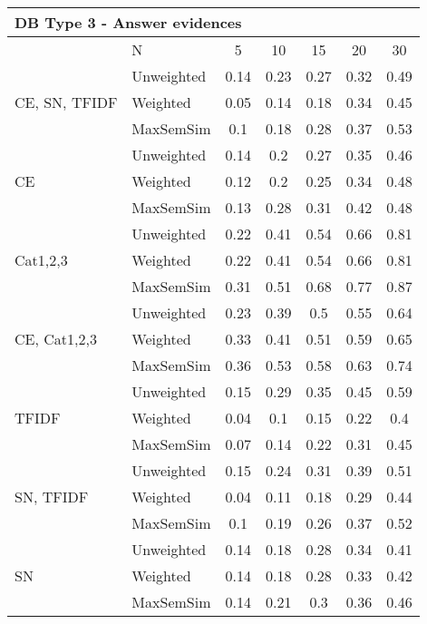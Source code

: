\documentclass[conference]{IEEEtran}
\begin{document}
\begin{table*}[!h]
\begin{tabular}{l||l|ccccc}
		\multicolumn{7}{l}{DB Type 3 - Answer evidences}\\\hline\hline
		& N & 5 & 10 & 15 & 20 & 30\\\hline
		\hline
		
		\multirow{3}{*}{CE, SN, TFIDF} & Unweighted & 0.14 & 0.23 & 0.27 & 0.32 & 0.49\\
		 & Weighted & 0.05 & 0.14 & 0.18 & 0.34 & 0.45\\
		 & MaxSemSim & 0.1 & 0.18 & 0.28 & 0.37 & 0.53\\ 
		\hline
		
		\multirow{3}{*}{CE} & Unweighted & 0.14 & 0.2 & 0.27 & 0.35 & 0.46\\
		 & Weighted & 0.12 & 0.2 & 0.25 & 0.34 & 0.48\\
		 & MaxSemSim & 0.13 & 0.28 & 0.31 & 0.42 & 0.48\\ 
		\hline
		
		\multirow{3}{*}{Cat1,2,3} & Unweighted & 0.22 & 0.41 & 0.54 & 0.66 & 0.81\\
		 & Weighted & 0.22 & 0.41 & 0.54 & 0.66 & 0.81\\
		 & MaxSemSim & 0.31 & 0.51 & 0.68 & 0.77 & 0.87\\ 
		\hline
		
		\multirow{3}{*}{CE, Cat1,2,3} & Unweighted & 0.23 & 0.39 & 0.5 & 0.55 & 0.64\\
		 & Weighted & 0.33 & 0.41 & 0.51 & 0.59 & 0.65\\
		 & MaxSemSim & 0.36 & 0.53 & 0.58 & 0.63 & 0.74\\ 
		\hline
		
		\multirow{3}{*}{TFIDF} & Unweighted & 0.15 & 0.29 & 0.35 & 0.45 & 0.59\\
		 & Weighted & 0.04 & 0.1 & 0.15 & 0.22 & 0.4\\
		 & MaxSemSim & 0.07 & 0.14 & 0.22 & 0.31 & 0.45\\ 
		\hline
		
		\multirow{3}{*}{SN, TFIDF} & Unweighted & 0.15 & 0.24 & 0.31 & 0.39 & 0.51\\
		 & Weighted & 0.04 & 0.11 & 0.18 & 0.29 & 0.44\\
		 & MaxSemSim & 0.1 & 0.19 & 0.26 & 0.37 & 0.52\\ 
		\hline
		
		\multirow{3}{*}{SN} & Unweighted & 0.14 & 0.18 & 0.28 & 0.34 & 0.41\\
		 & Weighted & 0.14 & 0.18 & 0.28 & 0.33 & 0.42\\
		 & MaxSemSim & 0.14 & 0.21 & 0.3 & 0.36 & 0.46\\ 
		\hline		
		

\end{tabular}
\end{table*}
\end{document}
